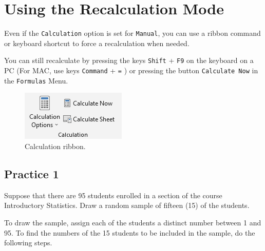 \documentclass[
]{book}
\begin{document}
\hypertarget{using-the-recalculation-mode}{%
\section{Using the Recalculation Mode}\label{using-the-recalculation-mode}}

Even if the \texttt{Calculation} option is set for \texttt{Manual}, you can use a ribbon command or keyboard shortcut to force a recalculation when needed.

You can still recalculate by pressing the keys \texttt{Shift} + \texttt{F9} on the keyboard on a PC (For MAC, use keys \texttt{Command} + \texttt{=} ) or pressing the button \texttt{Calculate\ Now} in the \texttt{Formulas} Menu.

\begin{figure}

{\centering \includegraphics[width=0.3\linewidth]{images/recalc-pc} 

}

\caption{Calculation ribbon.}\label{fig:calculation-ribbons}
\end{figure}

\hypertarget{practice-1-1}{%
\subsection{Practice 1}\label{practice-1-1}}

Suppose that there are 95 students enrolled in a section of the course Introductory Statistics. Draw a random sample of fifteen (15) of the students.

To draw the sample, assign each of the students a distinct number between 1 and 95. To find the numbers of the 15 students to be included in the sample, do the following steps.
\end{document}
